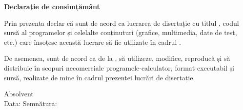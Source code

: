 \vspace*{\fill}
\begin{center}
    \large
    \textbf{Declarație de consimțământ}
\end{center}

Prin prezenta declar că sunt de acord ca lucrarea de disertație cu titlul \textbf{\thesistitle}, codul sursă al programelor și celelalte conținuturi (grafice, multimedia, date de test, etc.) care însoțesc această lucrare să fie utilizate în cadrul \facultygro.

De asemenea, sunt de acord ca \facultyro \space de la \universityro, să utilizeze, modifice, reproducă și să distribuie în scopuri necomerciale programele-calculator, format executabil și sursă, realizate de mine în cadrul prezentei lucrări de disertație.

\begin{flushright}
    Absolvent \textbf{\authornamefl} \\
    \vspace{0.5cm}
    Data: \dottedline \hspace{6cm} Semnătura: \dottedline
\end{flushright}
\vspace*{\fill}
\pagebreak